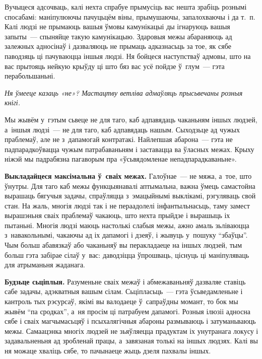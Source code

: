 
Вучыцеся адсочваць, калі нехта спрабуе прымусіць вас нешта зрабіць рознымі спосабамі: маніпулюючы пачуцьцём віны, прымушаючы, запалохваючы і да т.~п. Калі людзі не прымаюць вашыя ўмовы камунікацыі ды ігнаруюць вашыя запыты~--- спыняйце такую камунікацыю. Здаровыя межы абараняюць ад залежных адносінаў і дазваляюць не прымаць адказнасьць за тое, як сябе паводзяць ці пачуваюцца іншыя людзі. Ня бойцеся наступстваў адмовы, што на вас прытояць нейкую крыўду ці што бяз вас усё пойдзе ў~глум~--- гэта перабольшаньні.

\emph{Ня ўмееце казаць «не»? Мастацтву ветліва адмаўляць прысьвечаны розныя кнігі.}

Мы жывём у~гэтым сьвеце не для таго, каб адпавядаць чаканьням іншых людзей, а~іншыя людзі~--- не для таго, каб адпавядаць нашым. Сыходзьце ад чужых праблемаў, але не з~дапамогай контратакі. Найлепшая абарона~--- гэта не падпарадкоўвацца чужым патрабаваньням і заставацца ва ўласных межах. Крыху ніжэй мы падрабязна пагаворым пра «ўсьвядомленае непадпарадкаваньне».

\textbf{Выкладайцеся максімальна ў~сваіх межах.} Галоўнае~--- не мяжа, а~тое, што ўнутры. Для таго каб межы функцыянавалі аптымальна, важна ўмець самастойна вырашаць бягучыя задачы, спраўляцца з~эмацыйнымі выклікамі, рэгуляваць свой стан. На жаль, многія людзі так і не пераадолелі інфантыльнасьць, таму замест вырашэньня сваіх праблемаў чакаюць, што нехта прыйдзе і вырашыць іх пытаньні. Многія людзі маюць настолькі слабыя межы, ажно амаль зьліваюцца з~навакольнымі, чакаючы ад іх дапамогі і дзеяў, і жывуць у~пошуку ``збаўцы''. Чым больш абавязкаў або чаканьняў вы перакладаеце на іншых людзей, тым больш гэта забірае сілаў у~вас: даводзіцца ўпрошваць, ціснуць ці маніпуляваць для атрыманьня жаданага.


\textbf{Будзьце сьціплыя.} Разуменьне сваіх межаў і абмежаваньняў дазваляе ставіць сабе задачы, адэкватныя вашым сілам. Сьціпласьць~--- гэта ўсьведамленьне і кантроль тых рэсурсаў, якімі вы валодаеце ў~сапраўдны момант, то бок мы жывём ``па сродках'', а~ня просім ці патрабуем дапамогі. Розныя ілюзіі адносна сябе і сваіх магчымасьцяў і псыхалягічныя абароны размываюць і затуманьваюць межы. Самаацэнка многіх людзей не зьяўляецца прадуктам іх унутранага локусу і задавальненьня ад зробленай працы, а~завязаная толькі на іншых людзях. Калі вы ня можаце хваліць сябе, то пачынаеце жыць дзеля пахвалы іншых. 

